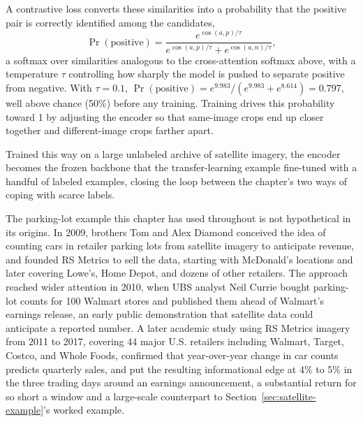 \documentclass[../ai_in_finance]{subfiles}
\begin{document}
A contrastive loss converts these similarities into a probability that the positive pair is correctly identified among the candidates, 
\begin{equation}
\Pr(\text{positive}) = \frac{e^{\cos(a,p)/\tau}}{e^{\cos(a,p)/\tau} + e^{\cos(a,n)/\tau}},
\label{eq:altdata-contrastive}
\end{equation}
a softmax over similarities analogous to the cross-attention softmax above, with a temperature $\tau$ controlling how sharply the model is pushed to separate positive from negative. With $\tau = 0.1$, $\Pr(\text{positive}) = e^{9.983}/(e^{9.983} + e^{8.614}) = 0.797$, well above chance (50\%) before any training. Training drives this probability toward 1 by adjusting the encoder so that same-image crops end up closer together and different-image crops farther apart.

Trained this way on a large unlabeled archive of satellite imagery, the encoder becomes the frozen backbone that the transfer-learning example fine-tuned with a handful of labeled examples, closing the loop between the chapter's two ways of coping with scarce labels.

\label{sec:case-vignette-satellite}

The parking-lot example this chapter has used throughout is not hypothetical in its origins. In 2009, brothers Tom and Alex Diamond conceived the idea of counting cars in retailer parking lots from satellite imagery to anticipate revenue, and founded RS Metrics to sell the data, starting with McDonald's locations and later covering Lowe's, Home Depot, and dozens of other retailers. The approach reached wider attention in 2010, when UBS analyst Neil Currie bought parking-lot counts for 100 Walmart stores and published them ahead of Walmart's earnings release, an early public demonstration that satellite data could anticipate a reported number. A later academic study using RS Metrics imagery from 2011 to 2017, covering 44 major U.S. retailers including Walmart, Target, Costco, and Whole Foods, confirmed that year-over-year change in car counts predicts quarterly sales, and put the resulting informational edge at 4\% to 5\% in the three trading days around an earnings announcement, a substantial return for so short a window and a large-scale counterpart to Section~\ref{sec:satellite-example}'s worked example.
\end{document}
